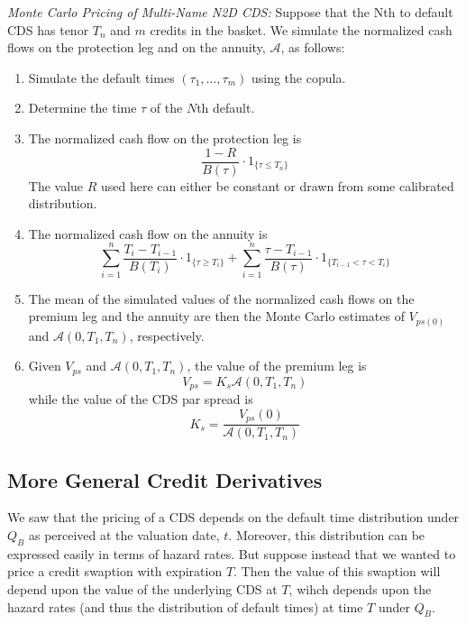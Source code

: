 \documentclass[a4paper,12pt]{scrartcl}
\begin{document}
\newpage
{\sl Monte Carlo Pricing of Multi-Name N2D CDS:} Suppose that
the Nth to default CDS has tenor $T_n$ and $m$ credits in the basket.
We simulate the normalized cash flows on the protection leg and on the
annuity, $\mathcal{A}$, as follows:
\begin{enumerate}
   \item Simulate the default times $(\tau_1, \ldots, \tau_m)$ using
      the copula.
   \item Determine the time $\tau$ of the $N$th default.
   \item The normalized cash flow on the protection leg is
      \begin{equation}
	 \label{mcpremleg}
	 \frac{1-R}{B(\tau)} \cdot 1_{ \{\tau \leq T_n \} } 
      \end{equation}
      The value $R$ used here can either be constant or drawn from
      some calibrated distribution.
   \item The normalized cash flow on the annuity is 
      \begin{equation}
	 \label{mcprotleg}
	  \sum^n_{i=1} \frac{T_i - T_{i-1}}{B(T_i)} \cdot
	 1_{ \{\tau \geq T_i \} }  + \sum^n_{i=1} 
	 \frac{\tau-T_{i-1}}{B(\tau)} \cdot 
	 1_{ \{T_{i-1}< \tau <T_i \} }  
      \end{equation}
   \item The mean of the simulated values of the normalized cash flows
      on the premium leg and the annuity are then the Monte Carlo 
      estimates of $V_{ps(0)}$ and $\mathcal{A}(0,T_1,T_n)$,
      respectively.
   \item Given $V_{ps}$ and $\mathcal{A}(0,T_1,T_n)$, the value of 
      the premium leg is
	 \[ V_{ps} = K_s \mathcal{A}(0,T_1,T_n) \]
      while the value of the CDS par spread is 
	 \[ K_s = \frac{V_{ps}(0)}{\mathcal{A}(0,T_1,T_n) } \]
\end{enumerate}

\subsection{More General Credit Derivatives}

We saw that the pricing of a CDS depends on the default time 
distribution under $Q_B$ as perceived at the valuation date, $t$. 
Moreover, this distribution can be expressed easily
in terms of hazard rates. But suppose instead that we wanted to 
price a credit swaption with expiration $T$. Then the value of
this swaption will depend upon the value of the underlying
CDS at $T$, wihch depends upon the hazard rates (and thus the
distribution of default times) at time $T$ under $Q_B$. 
\end{document}
